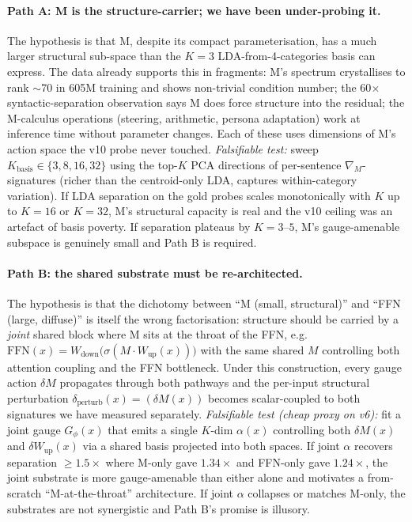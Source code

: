 \documentclass[11pt, a4paper]{article}
\theoremstyle{plain}
\theoremstyle{definition}
\theoremstyle{remark}
\begin{document}
\paragraph{Path A: M is the structure-carrier; we have been under-probing it.}
The hypothesis is that M, despite its compact parameterisation, has a much larger structural sub-space than the $K{=}3$ LDA-from-4-categories basis can express.
The data already supports this in fragments: M's spectrum crystallises to rank $\sim$70 in 605M training and shows non-trivial condition number; the 60$\times$ syntactic-separation observation says M does force structure into the residual; the M-calculus operations (steering, arithmetic, persona adaptation) work at inference time without parameter changes.
Each of these uses dimensions of M's action space the v10 probe never touched.
\textit{Falsifiable test:} sweep $K_{\mathrm{basis}} \in \{3, 8, 16, 32\}$ using the top-$K$ PCA directions of per-sentence $\nabla_M$-signatures (richer than the centroid-only LDA, captures within-category variation).
If LDA separation on the gold probes scales monotonically with $K$ up to $K{=}16$ or $K{=}32$, M's structural capacity is real and the v10 ceiling was an artefact of basis poverty.
If separation plateaus by $K{=}3$--$5$, M's gauge-amenable subspace is genuinely small and Path B is required.

\paragraph{Path B: the shared substrate must be re-architected.}
The hypothesis is that the dichotomy between ``M (small, structural)'' and ``FFN (large, diffuse)'' is itself the wrong factorisation: structure should be carried by a \emph{joint} shared block where M sits at the throat of the FFN, e.g.\ $\mathrm{FFN}(x) = W_{\mathrm{down}}\big(\sigma(M \cdot W_{\mathrm{up}}(x))\big)$ with the same shared $M$ controlling both attention coupling and the FFN bottleneck.
Under this construction, every gauge action $\delta M$ propagates through both pathways and the per-input structural perturbation $\delta_{\mathrm{perturb}}(x) = (\delta M(x))$ becomes scalar-coupled to both signatures we have measured separately.
\textit{Falsifiable test (cheap proxy on v6):} fit a joint gauge $G_\phi(x)$ that emits a single $K$-dim $\alpha(x)$ controlling both $\delta M(x)$ and $\delta W_{\mathrm{up}}(x)$ via a shared basis projected into both spaces.
If joint $\alpha$ recovers separation $\geq 1.5\times$ where M-only gave $1.34\times$ and FFN-only gave $1.24\times$, the joint substrate is more gauge-amenable than either alone and motivates a from-scratch ``M-at-the-throat'' architecture.
If joint $\alpha$ collapses or matches M-only, the substrates are not synergistic and Path B's promise is illusory.
\end{document}

